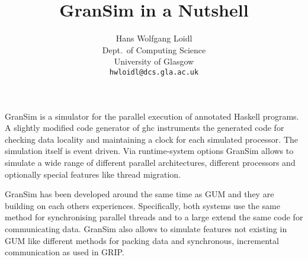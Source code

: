 % 
%




\title{GranSim in a Nutshell}

\author{
 \begin{tabular}{c} 
   Hans Wolfgang Loidl   \\
   Dept.\ of Computing Science  \\
   University of Glasgow \\
   {\tt hwloidl@dcs.gla.ac.uk} 
 \end{tabular}
}

\date{}

\maketitle

GranSim is a   simulator for the  parallel  execution of  annotated Haskell
programs. 
A slightly modified  code generator of ghc  instruments  the generated code
for checking data  locality  and  maintaining  a clock for  each  simulated
processor.  The simulation   itself is  event  driven.  Via  runtime-system
options GranSim  allows to simulate   a  wide range of  different  parallel
architectures, different  processors and  optionally special features  like
thread migration.

GranSim has  been developed  around the   same time as   GUM and  they  are
building  on  each others experiences.   Specifically, both systems use the
same method for synchronising  parallel threads and  to a large extend  the
same code for communicating data.  GranSim also allows to simulate features
not   existing in  GUM  like   different   methods  for  packing  data  and
synchronous, incremental communication as used in GRIP.

